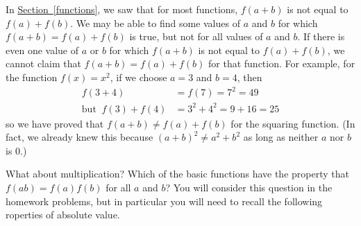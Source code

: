 \documentclass[10pt,]{book}
\theoremstyle{plain}
\theoremstyle{definition}
\theoremstyle{definition}
\theoremstyle{definition}
\theoremstyle{definition}
\theoremstyle{definition}
\numberwithin{equation}{section}
\newcommand{\amp}{ & }
\begin{document}
    In \hyperref[functions]{Section~\ref{functions}}, we saw that for most functions, \(f (a + b)\) is not equal to \(f (a) + f (b)\). We may be able to find some values of \(a\) and \(b\) for which \(f (a + b) = f (a) + f (b)\) is true, but not for all values of \(a\) and \(b\). If there is even one value of \(a\) or \(b\) for which \(f (a + b)\) is not equal to \(f (a) + f (b)\), we cannot claim that \(f (a + b) = f (a) + f (b)\) for that function. For example, for the function \(f (x) = x^2\), if we choose \(a = 3\) and \(b = 4\), then
    \begin{align*}
f (3 + 4) \amp = f (7) = 7^2 = 49\\
\text{but }~ f (3) + f (4) \amp = 3^2 + 4^2 = 9 + 16 = 25
\end{align*}
    so we have proved that \(f (a + b) \ne f (a) + f (b)\) for the squaring function. (In fact, we already knew this because \((a + b)^2 \ne a^2 + b^2\) as long as neither \(a\) nor \(b\) is \(0\).)
%
\par

    What about multiplication? Which of the basic functions have the property that \(f (ab) = f (a) f (b)\) for all \(a\) and \(b\)? You will consider this question in the homework problems, but in particular you will need to recall the following  roperties of absolute
value.
%
\typeout{************************************************}
\typeout{************************************************}
\end{document}
